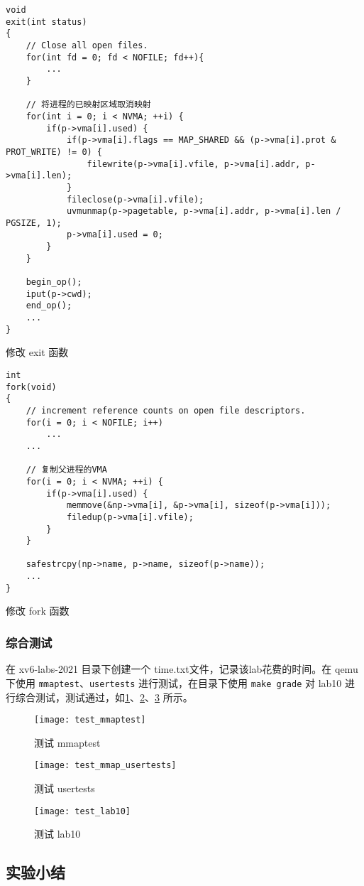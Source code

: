 \begin{listing}[!htb]
	\begin{verbatim}
void
exit(int status)
{
    // Close all open files.
    for(int fd = 0; fd < NOFILE; fd++){
        ...
    }

    // 将进程的已映射区域取消映射
    for(int i = 0; i < NVMA; ++i) {
        if(p->vma[i].used) {
            if(p->vma[i].flags == MAP_SHARED && (p->vma[i].prot & PROT_WRITE) != 0) {
                filewrite(p->vma[i].vfile, p->vma[i].addr, p->vma[i].len);
            }
            fileclose(p->vma[i].vfile);
            uvmunmap(p->pagetable, p->vma[i].addr, p->vma[i].len / PGSIZE, 1);
            p->vma[i].used = 0;
        }
    }

    begin_op();
    iput(p->cwd);
    end_op();
    ...
}	
	\end{verbatim}
	\caption{修改 exit 函数}\label{lst:mmap_exit}
\end{listing}

\begin{listing}[!htb]
	\begin{verbatim}
int
fork(void)
{
    // increment reference counts on open file descriptors.
    for(i = 0; i < NOFILE; i++)
        ...
    ...
    
    // 复制父进程的VMA
    for(i = 0; i < NVMA; ++i) {
        if(p->vma[i].used) {
            memmove(&np->vma[i], &p->vma[i], sizeof(p->vma[i]));
            filedup(p->vma[i].vfile);
        }
    }
    
    safestrcpy(np->name, p->name, sizeof(p->name));
    ...
}
	\end{verbatim}
	\caption{修改 fork 函数}\label{lst:mmap_fork}
\end{listing}

\subsubsection{综合测试}

在 xv6-labs-2021 目录下创建一个 time.txt文件，记录该lab花费的时间。在 qemu 下使用 \texttt{mmaptest}、\texttt{usertests} 进行测试，在目录下使用 \texttt{make grade} 对 lab10 进行综合测试，测试通过，如\cref{fig:test_mmaptest}、\cref{fig:test_mmap_usertests}、\cref{fig:test_lab10} 所示。

\begin{figure}[!htb]
	\centering
	\texttt{[image: test\_mmaptest]}
	\caption{测试 mmaptest}
	\label{fig:test_mmaptest}
\end{figure}

\begin{figure}[!htb]
	\centering
	\texttt{[image: test\_mmap\_usertests]}
	\caption{测试 usertests}
	\label{fig:test_mmap_usertests}
\end{figure}

\begin{figure}[!htb]
	\centering
	\texttt{[image: test\_lab10]}
	\caption{测试 lab10}
	\label{fig:test_lab10}
\end{figure}

\subsection{实验小结}